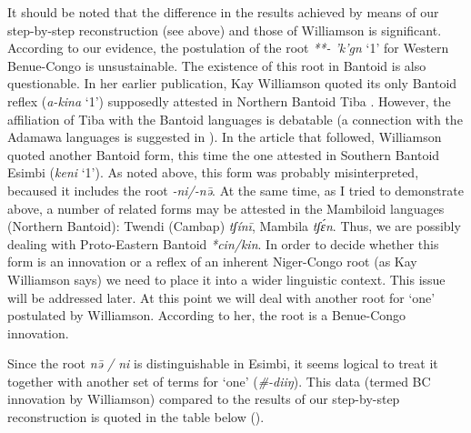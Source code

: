 \largerpage[2]
It should be noted that the difference in the results achieved by means of our step-by-step reconstruction (see above) and those of Williamson is significant. According to our evidence, the postulation of the root \textit{**- 'k{}'g{}n{}} ‘1’ for Western Benue-Congo is unsustainable. The existence of this root in Bantoid is also questionable. In her earlier publication, Kay Williamson quoted its only Bantoid reflex (\textit{a-kina} ‘1’) supposedly attested in Northern Bantoid Tiba \citep[255]{Williamson1989b}. However, the affiliation of Tiba with the Bantoid languages is debatable (a connection with the Adamawa languages is suggested in \citealt{Boyd1999}). In the article that followed, Williamson quoted another Bantoid form, this time the one attested in Southern Bantoid Esimbi (\textit{keni} ‘1’). As noted above, this form was probably misinterpreted, becaused it includes the root \textit{-ni/-n{\={ə}}}. At the same time, as I tried to demonstrate above, a number of related forms may be attested in the Mambiloid languages (Northern Bantoid): Twendi (Cambap) \textit{tʃínī}, Mambila \textit{tʃ{\'{ɛ}}n}. Thus, we are possibly dealing with Proto-Eastern Bantoid \textit{*cin/kin}. In order to decide whether this form is an innovation or a reflex of an inherent Niger-Congo root (as Kay Williamson says) we need to place it into a wider linguistic context. This issue will be addressed later. At this point we will deal with another root for ‘one’ postulated by Williamson. According to her, the root is a Benue-Congo innovation.

\newpage 
Since the root \textit{n{\={ə}} / ni} is distinguishable in Esimbi, it seems logical to treat it together with another set of terms for ‘one’ (\textit{\#-diiŋ}). This data (termed BC innovation by Williamson) compared to the results of our step-by-step reconstruction is quoted in the table below ().

